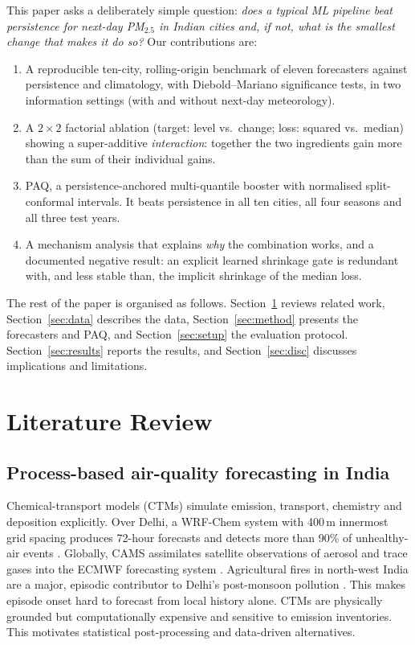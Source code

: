 \documentclass[conference]{IEEEtran}
\begin{document}
This paper asks a deliberately simple question: \emph{does a typical ML pipeline
beat persistence for next-day PM$_{2.5}$ in Indian cities and, if not, what is the
smallest change that makes it do so?} Our contributions are:
\begin{enumerate}
\item A reproducible ten-city, rolling-origin benchmark of eleven forecasters
against persistence and climatology, with Diebold--Mariano significance tests, in
two information settings (with and without next-day meteorology).
\item A $2\times2$ factorial ablation (target: level vs.\ change; loss: squared vs.\
median) showing a super-additive \emph{interaction}: together the two ingredients gain
more than the sum of their individual gains.
\item PAQ, a persistence-anchored multi-quantile booster with normalised
split-conformal intervals. It beats persistence in all ten cities, all four seasons and
all three test years.
\item A mechanism analysis that explains \emph{why} the combination works, and a
documented negative result: an explicit learned shrinkage gate is redundant with, and less
stable than, the implicit shrinkage of the median loss.
\end{enumerate}
The rest of the paper is organised as follows. Section~\ref{sec:rw} reviews related
work, Section~\ref{sec:data} describes the data, Section~\ref{sec:method} presents
the forecasters and PAQ, and Section~\ref{sec:setup} the evaluation protocol.
Section~\ref{sec:results} reports the results, and Section~\ref{sec:disc} discusses
implications and limitations.

\section{Literature Review}\label{sec:rw}
\subsection{Process-based air-quality forecasting in India}
Chemical-transport models (CTMs) simulate emission, transport, chemistry and
deposition explicitly. Over Delhi, a WRF-Chem system with 400\,m innermost grid spacing
produces 72-hour forecasts and detects more than 90\% of unhealthy-air events
\cite{jena2021}. Globally, CAMS assimilates satellite observations of aerosol and trace gases into
the ECMWF forecasting system \cite{inness2019}. Agricultural fires in north-west India
are a major, episodic contributor to Delhi's post-monsoon pollution \cite{cusworth2018}.
This makes episode onset hard to forecast from local history alone. CTMs are physically
grounded but computationally expensive and sensitive to emission inventories. This
motivates statistical post-processing and data-driven alternatives.
\end{document}
